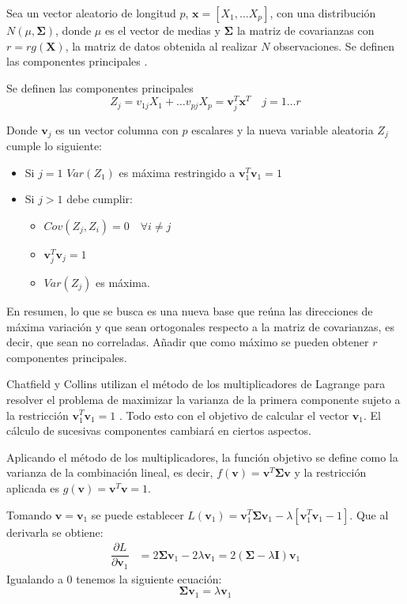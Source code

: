 \noindent Sea un vector aleatorio de longitud $p$, $\mathbf{x}=[X_1,\ldots X_p]$, con una distribución $N(\mu, \mathbf{\Sigma})$, donde $\mu$ es el vector de medias y $\mathbf{\Sigma}$ la matriz de covarianzas con $r=rg(\mathbf{X})$, la matriz de datos obtenida al realizar $N$ observaciones. Se definen las componentes principales \cite{Cuadras 2014}.
\begin{defi}
Se definen las componentes principales 
\begin{equation}
Z_j=v_{1j}X_1+\ldots v_{pj}X_p=\mathbf{v}_j^T\mathbf{x}^T \quad j=1\ldots r
\end{equation}

\noindent Donde $\textbf{v}_j$ es un vector columna con $p$ escalares y la nueva variable aleatoria $Z_j$ cumple lo siguiente:
\begin{itemize}
\item Si $j=1$ $Var(Z_1)$ es máxima restringido a $\mathbf{v}_1^T \mathbf{v}_1=1$
\item Si $j>1$ debe cumplir:
\begin{itemize}
\item $Cov(Z_j,Z_i)=0\quad \forall i\neq j $
\item $\textbf{v}_j^T \textbf{v}_j=1$
\item $Var(Z_j)$ es máxima. 
\end{itemize}
\end{itemize}
\noindent En resumen, lo que se busca es una nueva base que reúna las direcciones de máxima variación y que sean ortogonales respecto a la matriz de covarianzas, es decir, que sean no correladas. Añadir que como máximo se pueden obtener $r$ componentes principales. 
\end{defi}
\noindent Chatfield y Collins  utilizan el método de los multiplicadores de Lagrange para resolver el problema de maximizar  la varianza de la primera componente sujeto a la restricción $\textbf{v}_1^T\textbf{v}_1=1$ \cite{Chatfield 1989}. Todo esto con el objetivo de calcular el vector $\mathbf{v}_1$. El cálculo de sucesivas componentes cambiará en ciertos aspectos. 

\noindent Aplicando el método de los multiplicadores, la función objetivo se define como la varianza de la combinación lineal, es decir, $f(\mathbf{v})=\mathbf{v}^T \mathbf{\Sigma} \mathbf{v}$ y la restricción aplicada es $g(\textbf{v})=\textbf{v}^T\textbf{v}=1$. 

\noindent Tomando $\mathbf{v}=\textbf{v}_1$ se puede establecer $L(\textbf{v}_1)=\textbf{v}_1^T \mathbf{\Sigma} \textbf{v}_1 - \lambda[\textbf{v}_1^T \textbf{v}_1-1]$. Que al derivarla se obtiene:
\begin{align*}
\dfrac{\partial L}{\partial \textbf{v}_1} &= 2\mathbf{\Sigma} \textbf{v}_1 - 2\lambda\textbf{v}_1= 2(\mathbf{\Sigma}-\lambda\mathbf{I})\textbf{v}_1 
\end{align*}
\noindent Igualando a 0 tenemos la siguiente ecuación: 
\begin{equation}
\mathbf{\Sigma}\textbf{v}_1=\lambda \textbf{v}_1
\end{equation}

